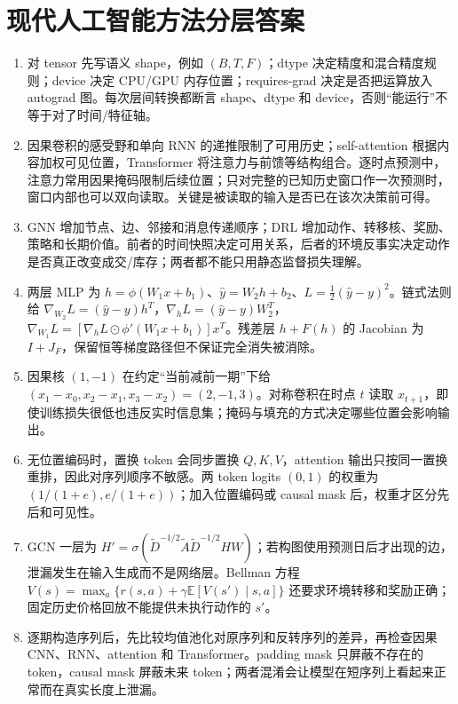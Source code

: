 \chapter{现代人工智能方法分层答案}

\begin{enumerate}[leftmargin=*]
  \item 对 tensor 先写语义 shape，例如 $(B,T,F)$；dtype 决定精度和混合精度规则；device 决定 CPU/GPU 内存位置；requires-grad 决定是否把运算放入 autograd 图。每次层间转换都断言 shape、dtype 和 device，否则“能运行”不等于对了时间/特征轴。
  \item 因果卷积的感受野和单向 RNN 的递推限制了可用历史；self-attention 根据内容加权可见位置，Transformer 将注意力与前馈等结构组合。逐时点预测中，注意力常用因果掩码限制后续位置；只对完整的已知历史窗口作一次预测时，窗口内部也可以双向读取。关键是被读取的输入是否已在该次决策前可得。
  \item GNN 增加节点、边、邻接和消息传递顺序；DRL 增加动作、转移核、奖励、策略和长期价值。前者的时间快照决定可用关系，后者的环境反事实决定动作是否真正改变成交/库存；两者都不能只用静态监督损失理解。
  \item 两层 MLP 为 $h=\phi(W_1x+b_1)$、$\hat y=W_2h+b_2$、$L=\frac12(\hat y-y)^2$。链式法则给 $\nabla_{W_2}L=(\hat y-y)h^T$，$\nabla_hL=(\hat y-y)W_2^T$，$\nabla_{W_1}L=[\nabla_hL\odot\phi'(W_1x+b_1)]x^T$。残差层 $h+F(h)$ 的 Jacobian 为 $I+J_F$，保留恒等梯度路径但不保证完全消失被消除。
  \item 因果核 $(1,-1)$ 在约定“当前减前一期”下给 $(x_1-x_0,x_2-x_1,x_3-x_2)=(2,-1,3)$。对称卷积在时点 $t$ 读取 $x_{t+1}$，即使训练损失很低也违反实时信息集；掩码与填充的方式决定哪些位置会影响输出。
  \item 无位置编码时，置换 token 会同步置换 $Q,K,V$，attention 输出只按同一置换重排，因此对序列顺序不敏感。两 token logits $(0,1)$ 的权重为 $(1/(1+e),e/(1+e))$；加入位置编码或 causal mask 后，权重才区分先后和可见性。
  \item GCN 一层为 $H'=\sigma(\tilde D^{-1/2}\tilde A\tilde D^{-1/2}HW)$；若构图使用预测日后才出现的边，泄漏发生在输入生成而不是网络层。Bellman 方程 $V(s)=\max_a\{r(s,a)+\gamma\mathbb E[V(s')\mid s,a]\}$ 还要求环境转移和奖励正确；固定历史价格回放不能提供未执行动作的 $s'$。
  \item 逐期构造序列后，先比较均值池化对原序列和反转序列的差异，再检查因果 CNN、RNN、attention 和 Transformer。padding mask 只屏蔽不存在的 token，causal mask 屏蔽未来 token；两者混淆会让模型在短序列上看起来正常而在真实长度上泄漏。


\end{enumerate}
